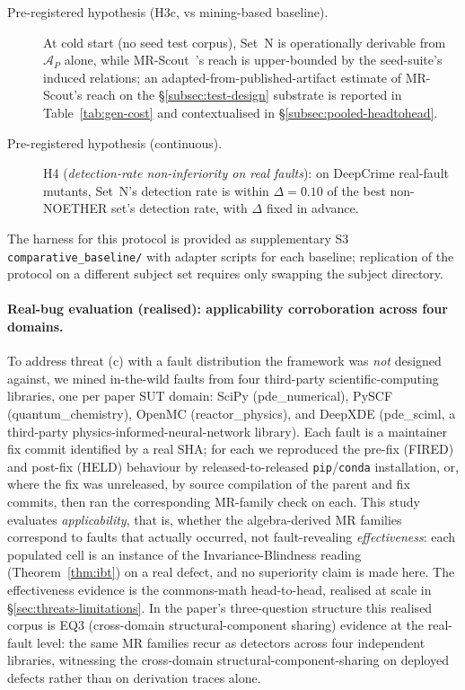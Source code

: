 \documentclass[acmsmall,screen,review]{acmart}
\begin{document}
\begin{description}
  \item[Pre-registered hypothesis (H3c, vs mining-based baseline).] At cold start (no seed test corpus), Set~N is operationally derivable from $\mathcal{A}_P$ alone, while MR-Scout~\cite{MRScout2024}'s reach is upper-bounded by the seed-suite's induced relations; an adapted-from-published-artifact estimate of MR-Scout's reach on the §\ref{subsec:test-design} substrate is reported in Table~\ref{tab:gen-cost} and contextualised in \S\ref{subsec:pooled-headtohead}.
  \item[Pre-registered hypothesis (continuous).] H4 (\emph{detection-rate non-inferiority on real faults}): on DeepCrime real-fault mutants, Set~N's detection rate is within $\Delta = 0.10$ of the best non-NOETHER set's detection rate, with $\Delta$ fixed in advance.
\end{description}

The harness for this protocol is provided as supplementary S3 \texttt{comparative\_baseline/} with adapter scripts for each baseline; replication of the protocol on a different subject set requires only swapping the subject directory.

\paragraph{Real-bug evaluation (realised): applicability corroboration across four domains.}
\label{para:real-bug-protocol}
To address threat (c) with a fault distribution the framework was \emph{not} designed against, we mined in-the-wild faults from four third-party scientific-computing libraries, one per paper SUT domain: SciPy (pde\_numerical), PySCF (quantum\_chemistry), OpenMC (reactor\_physics), and DeepXDE (pde\_sciml, a third-party physics-informed-neural-network library). Each fault is a maintainer fix commit identified by a real SHA; for each we reproduced the pre-fix (FIRED) and post-fix (HELD) behaviour by released-to-released \texttt{pip}/\texttt{conda} installation, or, where the fix was unreleased, by source compilation of the parent and fix commits, then ran the corresponding MR-family check on each. This study evaluates \emph{applicability}, that is, whether the algebra-derived MR families correspond to faults that actually occurred, not fault-revealing \emph{effectiveness}: each populated cell is an instance of the Invariance-Blindness reading (Theorem~\ref{thm:ibt}) on a real defect, and no superiority claim is made here. The effectiveness evidence is the commons-math head-to-head, realised at scale in \S\ref{sec:threats-limitations}. In the paper's three-question structure this realised corpus is EQ3 (cross-domain structural-component sharing) evidence at the real-fault level: the same MR families recur as detectors across four independent libraries, witnessing the cross-domain structural-component-sharing on deployed defects rather than on derivation traces alone.
\end{document}
